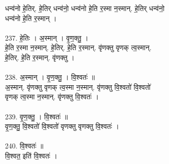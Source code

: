 धन्व॑नो हे॒तिर्. हे॒तिर् धन्व॑नो॒ धन्व॑नो हे॒ति र॒स्मा न॒स्मान्. हे॒तिर् धन्व॑नो॒\\
धन्व॑नो हे॒ति र॒स्मान् ।\\
\\
237. हे॒तिः । अ॒स्मान् । वृ॒ण॒क्तु॒ ।\\
हे॒ति र॒स्मा न॒स्मान्. हे॒तिर्. हे॒ति र॒स्मान्. वृ॑णक्तु वृणक् त्व॒स्मान्.\\
हे॒तिर्. हे॒ति र॒स्मान्. वृ॑णक्तु ।\\
\\
238. अ॒स्मान् । वृ॒ण॒क्तु॒ । वि॒श्वतः॑ ॥\\
अ॒स्मान्. वृ॑णक्तु वृणक् त्व॒स्मा न॒स्मान्. वृ॑णक्तु वि॒श्वतो॑ वि॒श्वतो॑\\
वृणक् त्व॒स्मा न॒स्मान्. वृ॑णक्तु वि॒श्वतः॑ ।\\
\\
239. वृ॒ण॒क्तु॒ । वि॒श्वतः॑ ॥\\
वृ॒ण॒क्तु॒ वि॒श्वतो॑ वि॒श्वतो॑ वृणक्तु वृणक्तु वि॒श्वतः॑ ।\\
\\
240. वि॒श्वतः॑ ॥\\
वि॒श्वत॒ इति॑ वि॒श्वतः॑ ।\\
\\
